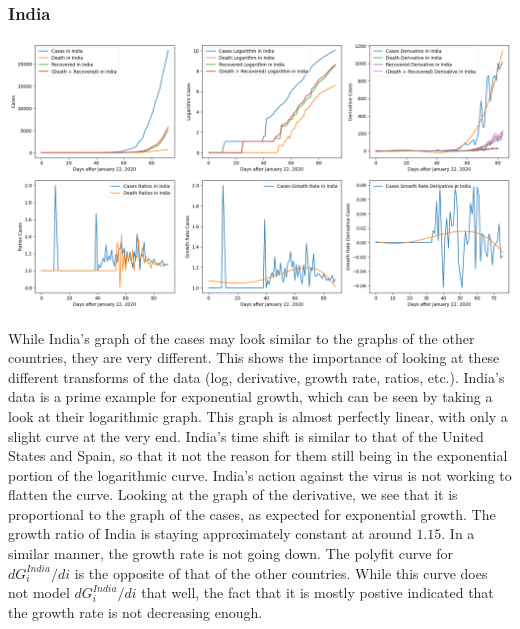 \documentclass{report}
\begin{document}
            \subsubsection{India}
                \begin{center}
                    \includegraphics[width=\textwidth]{plots/india/analyze.png}
                \end{center}
                While India's graph of the cases may look similar to the graphs of the other countries, they are very different. This shows the importance of looking at these different transforms of the data (log, derivative, growth rate, ratios, etc.).
                \newline\indent
                India's data is a prime example for exponential growth, which can be seen by taking a look at their logarithmic graph. This graph is almost perfectly linear, with only a slight curve at the very end. India's time shift is similar to that of the United States and Spain, so that it not the reason for them still being in the exponential portion of the logarithmic curve. India's action against the virus is not working to flatten the curve. Looking at the graph of the derivative, we see that it is proportional to the graph of the cases, as expected for exponential growth. 
                \newline\indent
                The growth ratio of India is staying approximately constant at around $1.15$. In a similar manner, the growth rate is not going down. The polyfit curve for $dG^{India}_i/di$ is the opposite of that of the other countries. While this curve does not model $dG^{India}_i/di$ that well, the fact that it is mostly postive indicated that the growth rate is not decreasing enough.
\end{document}
